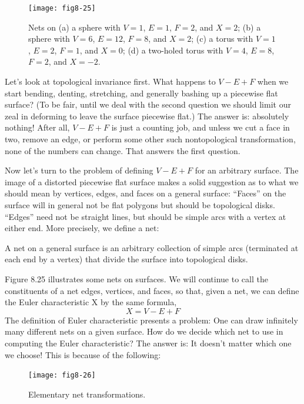 \documentclass{book}
\begin{document}
\begin{figure}
\begin{center}
\texttt{[image: fig8-25]}
\caption{Nets on (a) a sphere with $V = 1$, $E = 1$, $F = 2$, and $X = 2$; (b) a sphere with $V = 6$, $E = 12$, $F = 8$, and $X = 2$; (c) a torus with $V = 1$, $E = 2$, $F = 1$, and $X = 0$; (d) a two-holed torus with $V = 4$, $E = 8$, $F = 2$, and $X = -2$.}
\end{center}
\end{figure}

Let's look at topological invariance first. What happens to $V - E + F$
when we start bending, denting, stretching, and generally bashing up a
piecewise flat surface? (To be fair, until we deal with the second question
we should limit our zeal in deforming to leave the surface piecewise
flat.) The answer is: absolutely nothing! After all, $V - E + F$ is just a
counting job, and unless we cut a face in two, remove an edge, or perform
some other such nontopological transformation, none of the numbers can
change. That answers the first question.

Now let's turn to the problem of defining $V - E + F$ for an arbitrary
surface. The image of a distorted piecewise flat surface makes a solid
suggestion as to what we should mean by vertices, edges, and faces on
a general surface: ``Faces'' on the surface will in general not be flat
polygons but should be topological disks. ``Edges'' need not be straight
lines, but should be simple arcs with a vertex at either end. More
precisely, we define a net:

A net on a general surface is an arbitrary collection of simple arcs
(terminated at each end by a vertex) that divide the surface into topological disks.

Figure 8.25 illustrates some nets on surfaces. We will continue to
call the constituents of a net edges, vertices, and faces, so that, given
a net, we can define the Euler characteristic X by the same formula,
$$X = V - E + F$$
 The definition of Euler characteristic presents a problem: One can
draw infinitely many different nets on a given surface. How do we decide
which net to use in computing the Euler characteristic? The answer is:
It doesn't matter which one we choose! This is because of the following:

\begin{figure}
\begin{center}
\texttt{[image: fig8-26]}
\caption{Elementary net transformations.}
\end{center}
\end{figure}
\end{document}
